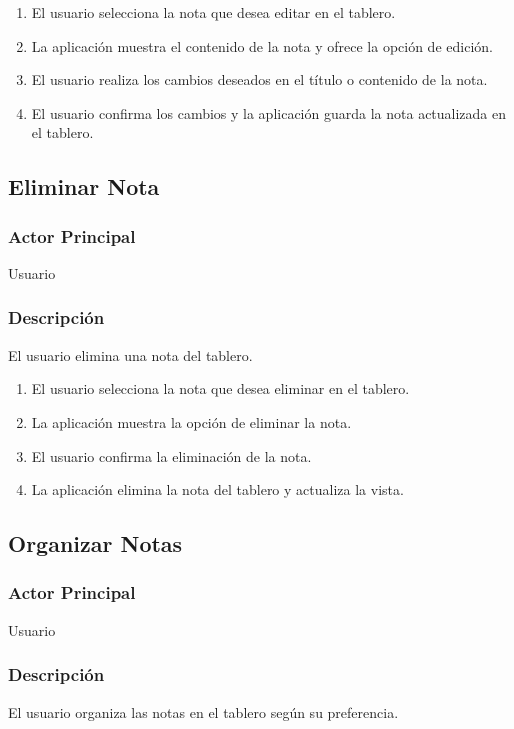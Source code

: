 \begin{enumerate}
  \item El usuario selecciona la nota que desea editar en el tablero.
  \item La aplicación muestra el contenido de la nota y ofrece la opción de edición.
  \item El usuario realiza los cambios deseados en el título o contenido de la nota.
  \item El usuario confirma los cambios y la aplicación guarda la nota actualizada en el tablero.
\end{enumerate}

\subsection{Eliminar Nota}
\subsubsection{Actor Principal}
Usuario

\subsubsection{Descripción}
El usuario elimina una nota del tablero.

\begin{enumerate}
  \item El usuario selecciona la nota que desea eliminar en el tablero.
  \item La aplicación muestra la opción de eliminar la nota.
  \item El usuario confirma la eliminación de la nota.
  \item La aplicación elimina la nota del tablero y actualiza la vista.
\end{enumerate}

\subsection{Organizar Notas}
\subsubsection{Actor Principal}
Usuario

\subsubsection{Descripción}
El usuario organiza las notas en el tablero según su preferencia.

